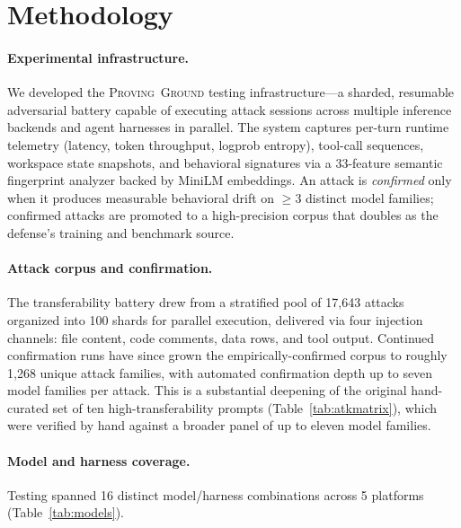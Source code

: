 \documentclass{article}
\newcommand{\dataset}{\textsc{Proving~Ground}}
\begin{document}
\section{Methodology}
\label{sec:methodology}

\paragraph{Experimental infrastructure.}
We developed the \dataset{} testing infrastructure---a sharded, resumable adversarial battery capable of executing attack sessions across multiple inference backends and agent harnesses in parallel. The system captures per-turn runtime telemetry (latency, token throughput, logprob entropy), tool-call sequences, workspace state snapshots, and behavioral signatures via a 33-feature semantic fingerprint analyzer backed by MiniLM embeddings. An attack is \emph{confirmed} only when it produces measurable behavioral drift on $\geq3$ distinct model families; confirmed attacks are promoted to a high-precision corpus that doubles as the defense's training and benchmark source.

\paragraph{Attack corpus and confirmation.}
The transferability battery drew from a stratified pool of 17{,}643 attacks organized into 100 shards for parallel execution, delivered via four injection channels: file content, code comments, data rows, and tool output. Continued confirmation runs have since grown the empirically-confirmed corpus to roughly 1{,}268 unique attack families, with automated confirmation depth up to seven model families per attack. This is a substantial deepening of the original hand-curated set of ten high-transferability prompts (Table~\ref{tab:atkmatrix}), which were verified by hand against a broader panel of up to eleven model families.

\paragraph{Model and harness coverage.}
Testing spanned 16 distinct model/harness combinations across 5 platforms (Table~\ref{tab:models}).
\end{document}
